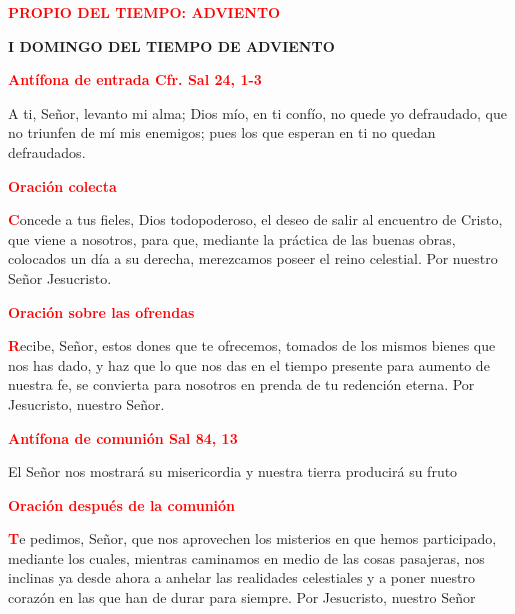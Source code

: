 \documentclass[12pt, letterpaper]{report}
\begin{document}
\begin{center}
\Large {\bfseries \textcolor{red}{PROPIO DEL TIEMPO: ADVIENTO}}
\end{center}

\begin{center}
\Huge {\bfseries I DOMINGO DEL TIEMPO DE ADVIENTO}
\end{center}

\Large {\bfseries \textcolor{red}{Ant\'ifona de entrada \hspace{1cm} Cfr. Sal 24, 1-3} }

\Large {A ti, Se\~nor, levanto mi alma; Dios m\'io, en ti conf\'io, no quede yo defraudado, que no triunfen de m\'i mis enemigos; pues los que esperan en ti no quedan defraudados.}

\Large {\bfseries \textcolor{red}{Oraci\'on colecta}}

\lettrine[lines=1]{\bfseries \textcolor{red}{C}}{}\Large {oncede a tus fieles, Dios todopoderoso, el deseo de salir al encuentro de Cristo, que viene a nosotros, para que, mediante la pr\'actica de las buenas obras, colocados un d\'ia a su derecha, merezcamos poseer el reino celestial. Por nuestro Se\~nor Jesucristo.}

\Large {\bfseries \textcolor{red}{Oraci\'on sobre las ofrendas}}

\lettrine[lines=1]{\bfseries \textcolor{red}{R}}{}\Large ecibe, Se\~nor, estos dones que te ofrecemos, tomados de los mismos bienes que nos has dado, y haz que lo que nos das en el tiempo presente para aumento de nuestra fe, se convierta para nosotros en prenda de tu redenci\'on eterna. Por Jesucristo, nuestro Se\~nor.

\newpage

\Large {\bfseries \textcolor{red}{Ant\'ifona de comuni\'on \hspace{1cm} Sal 84, 13}}

\Large El Se\~nor nos mostrar\'a su misericordia y nuestra tierra producir\'a su fruto

\Large {\bfseries \textcolor{red}{Oraci\'on despu\'es de la comuni\'on}}

\lettrine[lines=1]{\bfseries \textcolor{red}{T}}{}\Large e pedimos, Se\~nor, que nos aprovechen los misterios en que hemos participado, mediante los cuales, mientras caminamos en medio de las cosas pasajeras, nos inclinas ya desde ahora a anhelar las realidades celestiales y a poner nuestro coraz\'on en las que han de durar para
siempre. Por Jesucristo, nuestro Se\~nor
\end{document}
